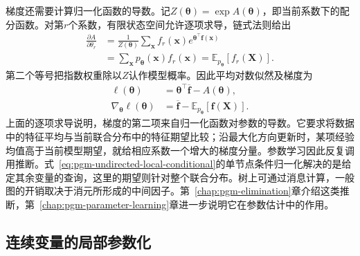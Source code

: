 梯度还需要计算归一化函数的导数。记$Z(\bm{\theta})=\exp A(\bm{\theta})$，即当前系数下的配分函数。对第$r$个系数，有限状态空间允许逐项求导，链式法则给出
\[
  \begin{aligned}
    \frac{\partial A}{\partial\theta_r}
    &=\frac1{Z(\bm{\theta})}
       \sum_{\bm{x}}f_r(\bm{x})
          e^{\bm{\theta}^{\top}\bm{f}(\bm{x})}\\
    &=\sum_{\bm{x}}p_{\bm{\theta}}(\bm{x})f_r(\bm{x})
      =\mathbb{E}_{p_{\bm{\theta}}}[f_r(\bm{X})].
  \end{aligned}
\]
第二个等号把指数权重除以$Z$认作模型概率。因此平均对数似然及梯度为
\begin{equation}
  \begin{aligned}
    \ell(\bm{\theta})
      &=\bm{\theta}^{\top}\overline{\bm{f}}-A(\bm{\theta}),\\
    \nabla_{\bm{\theta}}\ell(\bm{\theta})
      &=\overline{\bm{f}}
        -\mathbb{E}_{p_{\bm{\theta}}}[\bm{f}(\bm{X})].
  \end{aligned}
  \label{eq:pgm-undirected-learning-gradient}
\end{equation}
上面的逐项求导说明，梯度的第二项来自归一化函数对参数的导数。它要求将数据中的特征平均与当前联合分布中的特征期望比较；沿最大化方向更新时，某项经验均值高于当前模型期望，就给相应系数一个增大的梯度分量。参数学习因此反复调用推断。式~\eqref{eq:pgm-undirected-local-conditional}的单节点条件归一化解决的是给定其余变量的查询，这里的期望则针对整个联合分布。树上可通过消息计算，一般图的开销取决于消元所形成的中间因子。第~\ref{chap:pgm-elimination}章介绍这类推断，第~\ref{chap:pgm-parameter-learning}章进一步说明它在参数估计中的作用。

\subsection{连续变量的局部参数化}
\label{sec:pgm-undirected-continuous-parameterization}

